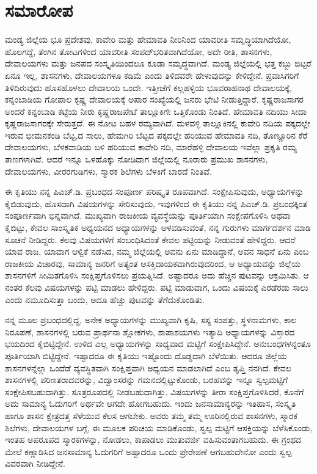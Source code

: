 
\chapter{ಸಮಾರೋಪ}

ಮಂಡ್ಯ ಜಿಲ್ಲೆಯ ಭೂ ಪ್ರದೇಶವು, ಕಾವೇರಿ ಮತ್ತು ಹೇಮಾವತಿ ನೀರಿನಿಂದ ಯಾವರೀತಿ ಸಮೃದ್ಧಿಯಾಗಿದೆಯೋ, ಹೊಲಗದ್ದೆ, ತೆಂಗಿನ ತೋಟಗಳಿಂದ ಯಾವರೀತಿ ಸಂಪದ್​ಭರಿತವಾಗಿದೆಯೋ, ಅದೇ ರೀತಿ, ಶಾಸನಗಳು, ದೇವಾಲಯಗಳು ಮತ್ತು ಜನಪದ ಸಂಸ್ಕೃತಿಯಿಂದಲೂ ಕೂಡಾ ಸಮೃದ್ಧವಾಗಿದೆ. ಮಂಡ್ಯ ಜಿಲ್ಲೆಯಲ್ಲಿ ಭತ್ತ ಕಬ್ಬು ಬಿಟ್ಟರೆ ಏನೂ ಇಲ್ಲ, ಶಾಸನಗಳು, ದೇವಾಲಯಗಳೂ ಕಡಿಮೆ ಎಂದು ತಿಳಿದವರೇ ಹೇಳುವುದನ್ನು ಕೇಳಿದ್ದೇನೆ. ಪ್ರವಾಸಿಗರಿಗೆ ತಿಳಿದಿರುವುದು ಹೊಸಹೊಳಲು ದೇವಾಲಯ ಒಂದೇ. ಇತ್ತೀಚೆಗೆ ಕಲ್ಲಹಳ್ಳಿಯ ಭೂವರಾಹನಾಥ ದೇವಾಲಯಕ್ಕೆ, ಕನ್ನಂಬಾಡಿಯ ಗೋಪಾಲ ಕೃಷ್ಣ ದೇವಾಲಯಕ್ಕೆ ಅಪಾರ ಸಂಖ್ಯೆಯಲ್ಲಿ ಜನರು ಭೇಟಿ ನೀಡುತ್ತಿದ್ದಾರೆ. ಕೃಷ್ಣರಾಜಸಾಗರ ಅಂದರೆ ಕನ್ನಂಬಾಡಿ ಕಟ್ಟೆಯ ನೀರು ಕೃಷ್ಣರಾಜಪೇಟೆ ತಾಲ್ಲೂಕಿಗೇ ಒತ್ತಿಕೊಂಡು ನಿಂತಿದೆ. ಹೇಮಾವತಿ ನದಿಯು ಸೀದಾ ಕೃಷ್ಣರಾಜಸಾಗರಕ್ಕೇ ಸೇರುತ್ತದೆ. ಈ ನೋಟ ಬಹಳ ರಮ್ಯವಾಗಿದೆ. ಮಳವಳ್ಳಿ ತಾಲ್ಲೂಕಿನಲ್ಲಿ ಕಾವೇರಿ ನದಿಯ ಪಕ್ಕದಲ್ಲೇ ಇರುವ ಭೀಮನಕಂಡಿ ಬೆಟ್ಟ,ದ ಸಾಲು, ಹೇಮಗಿರಿ ಬೆಟ್ಟದ ಪಕ್ಕದಲ್ಲೇ ಹರಿಯುವ ಹೇಮಾವತಿ ನದಿ, ತೊಣ್ಣೂರಿನ ಕೆರೆ ದೇವಾಲಯಗಳು, ಬೆಳಕವಾಡಿಯ ಬಳಿ ಹರಿಯುವ ಕಾವೇರಿ ನದಿ, ಮಾರೆಹಳ್ಳಿ ದೇವಾಲಯ ಇವೆಲ್ಲಾ ಪ್ರಕೃತಿ ರಮ್ಯ ತಾಣಗಳಾಗಿವೆ. ಆದರೆ ಇನ್ನೂ ಒಳಹೊಕ್ಕು ನೋಡಿದಾಗ ಜಿಲ್ಲೆಯಲ್ಲಿ ನೂರಾರು ಪ್ರಮುಖ ಶಾಸನಗಳು, ದೇವಾಲಯಗಳು, ವೀರರಗುಡಿಗಳು, ಸ್ಮಾರಕ ಶಿಲೆಗಳು ಬೆಳಕಿಗೆ ಬಾರದೆ ನಿಂತಿವೆ.

ಈ ಕೃತಿಯು ನನ್ನ ಪಿಎಚ್​.ಡಿ. ಪ್ರಬಂಧದ ಸಂಪೂರ್ಣ ಪರಿಷ್ಕೃತ ರೂಪವಾಗಿದೆ. ಸಂಕ್ಷೇಪಿಸುವುದು, ಅಧ್ಯಾಯಗಳನ್ನು ಕೈಬಿಡುವುದು, ಹೊಸದಾಗಿ ವಿಷಯಗಳನ್ನು ಸೇರಿಸುವುದು, ಇವುಗಳಿಂದ ಈ ಕೃತಿಯು ನನ್ನ ಪಿಎಚ್​.ಡಿ. ಪ್ರಬಂಧಕ್ಕಿಂತ ಸಂಪೂರ್ಣವಾಗಿ ಭಿನ್ನವಾಗಿದೆ. ಮುಖ್ಯವಾಗಿ ರಾಜಕೀಯ ವ್ಯವಸ್ಥೆಯನ್ನು ಪೂರ್ತಿಯಾಗಿ ಸಂಕ್ಷೇಪಗೊಳಿಸಿ ಅಥವಾ ಕೈಬಿಟ್ಟು, ಕೇವಲ ಸಾಂಸ್ಕೃತಿಕ ಅಧ್ಯಯನದ ಅಧ್ಯಾಯಗಳನ್ನು ಅಳವಡಿಸುವಂತೆ, ನನ್ನ ಗುರುಗಳು ಮಾರ್ಗದರ್ಶನ ಮಾಡಿ ಸೂಚನೆ ನೀಡಿದ್ದರು. ಕೆಲವು ವಿಷಯಗಳಿಗೆ ಸಂಬಂಧಿಸಿದಂತೆ ಕೇವಲ ಪಟ್ಟಿಯನ್ನು ನೀಡುವಂತೆ ಹೇಳಿದ್ದರು. ಆದರೆ ಯಾವ ರಾಜ, ಯಾವಾಗ ಆಳ್ವಿಕೆ ನಡೆಸಿದ, ನಮ್ಮ ಜಿಲ್ಲೆಯಲ್ಲಿ ಅವನು ಏನು ಮಾಡಿದ್ದಾನೆ, ಅವನ ಸಾಧನೆ ಏನು ಎಂಬ ರಾಜಕೀಯ ವಿಚಾರವು, ಸಾಮಾನ್ಯ ಜನರಿಗೆ ಅತ್ಯಂತ ಆಸಕ್ತಿದಾಯಕವಾಗಿರುವುದರಿಂದ, ಆ ಅಧ್ಯಾಯವನ್ನು ಜಿಲ್ಲೆಯ ಶಾಸನಗಳಿಗೆ ಸೀಮಿತಗೊಳಿಸಿ ಸಂಕ್ಷಿಪ್ತಗೊಳಿಸಲು ಪ್ರಯತ್ನಿಸಿದೆ. ಅಷ್ಟಾದರೂ ಅದು ಹೆಚ್ಚಿನ ಪುಟವನ್ನು ಆಕ್ರಮಿಸಿತು. ಆ ನಂತರ ಕೆಲವು ವಿಷಯಗಳನ್ನು ಪಟ್ಟಿ ಮಾಡಲು ಹೇಳಿದ್ದರು. ಪಟ್ಟಿ ಮಾಡುವಾಗ, ಒಂದು ವಿಷಯಕ್ಕೆ ಎರಡೆರಡು ಸಾಲು ಎಂದು ನಮೂದಿಸುತ್ತಾ ಬಂದು, ಅದೂ ಹೆಚ್ಚು ಪುಟವನ್ನು ತೆಗೆದುಕೊಂಡಿತು.

ನನ್ನ ಮೂಲ ಪ್ರಬಂಧದಲ್ಲಿದ್ದ, ಅನೇಕ ಅಧ್ಯಾಯಗಳನ್ನು ಮುಖ್ಯವಾಗಿ ಕೃಷಿ, ಸಸ್ಯ ಸಂಪತ್ತು, ಸ್ಥಳನಾಮಗಳು, ಕಾಲ ನಿರೂಪಣೆ, ಶಾಸನಗಳಲ್ಲಿ ಬರುವ ಪ್ರಾರ್ಥನಾ ಶ್ಲೋಕಗಳು, ಶಾಪಾಶಯಗಳು ಇತ್ಯಾದಿ ಅಧ್ಯಾಯಗಳನ್ನು ವಿಸ್ತಾರದ ಭಯದಿಂದ ಕೈಬಿಟ್ಟಿದ್ದೇನೆ. ಉಳಿದ ಎಲ್ಲ ಅಧ್ಯಾಯಗಳನ್ನು ಸಾಧ್ಯವಾದ ಮಟ್ಟಿಗೆ ಸಂಕ್ಷೇಪಿಸಿದ್ದೇನೆ. ಅನುಬಂಧಗಳನ್ನಂತೂ ಪೂರ್ತಿಯಾಗಿ ಬಿಟ್ಟಿದ್ದೇನೆ. ಇಷ್ಟಾದರೂ ಈ ಕೃತಿಯು ಇಷ್ಟೊಂದು ದೊಡ್ಡದಾಗಿ ಬೆಳೆಯಿತು. ಆದರೂ ಜಿಲ್ಲೆಯ ಶಾಸನಗಳನ್ನೆಲ್ಲಾ ಒಂದೆಡೆ ವ್ಯವಸ್ಥಿತವಾಗಿ ಸಂಕ್ಷಿಪ್ತವಾಗಿ ಅಧ್ಯಯನ ಮಾಡಲಾಗಿದೆ ಎಂಬ ತೃಪ್ತಿ ನನಗಿದೆ. ಕೇವಲ ಶಾಸನಗಳಲ್ಲಿ ಪರಿಣತರಾದವರನ್ನು, ವಿದ್ವಾಂಸರನ್ನು ಗಮನದಲ್ಲಿಟ್ಟುಕೊಂಡು, ಬರಹವನ್ನು ಇನ್ನೂ ಸ್ವಲ್ಪಮಟ್ಟಿಗೆ ಸಂಕ್ಷೇಪಿಸಬಹುದಾಗಿತ್ತು. ಸೂತ್ರರೂಪದಲ್ಲಿ ನೀಡಬಹುದಾಗಿತ್ತು. ವಿಷಯಗಳನ್ನು ತೀರಾ ಸಂಕ್ಷಿಪ್ತಗೊಳಿಸಿದರೆ, ಕೊನೆಗೆ ಅದು ಸಾಮಾನ್ಯ ಓದುಗರಿಗೆ ಅರ್ಥವೇ ಆಗದೇ ಹೋಗಬಹುದು. ಇಂದು ಜನಸಾಮಾನ್ಯರನ್ನು ಇತಿಹಾಸ, ಸಂಸ್ಕೃತಿ ಹಾಗೂ ಶಾಸನ ಕ್ಷೇತ್ರದತ್ತ ಸೆಳೆಯುವ ಕೆಲಸ ಆಗಬೇಕು. ಅವರು ತಮ್ಮ ತಮ್ಮ ಊರಿನಲ್ಲಿರುವ ಶಾಸನಗಳು, ಸ್ಮಾರಕ ಶಿಲೆಗಳು, ದೇವಾಲಯಗಳ ಬಗ್ಗೆ, ಈ ಮೂಲಕ ಪರಿಚಯ ಮಾಡಿಕೊಂಡು, ಸ್ವಲ್ಪ ಮಟ್ಟಿಗೆ ಆಸಕ್ತಿಯನ್ನು ಬೆಳೆಸಿಕೊಂಡು, ಇಂತಹ ಅಪರೂಪದ ಸ್ಮಾರಕಗಳನ್ನು, ನೋಡಲು, ಕಾಪಾಡಲು ಮುತುವರ್ಜಿ ವಹಿಸುವಂತಾಗಬಹುದು. ಈ ಗ್ರಂಥದ ಮೇಲೆ ಕಣ್ಣಾಡಿಸಿದ ಜನಸಾಮಾನ್ಯ ಓದುಗರಿಗೆ ಅಷ್ಟಾದರೂ ಒಂದು ಪ್ರೇರೇಪಣೆ ಆಗಬಹುದೇನೋ ಎಂದು ಸ್ವಲ್ಪ ವಿವರವಾಗಿ ನೀಡಿದ್ದೇನೆ.

